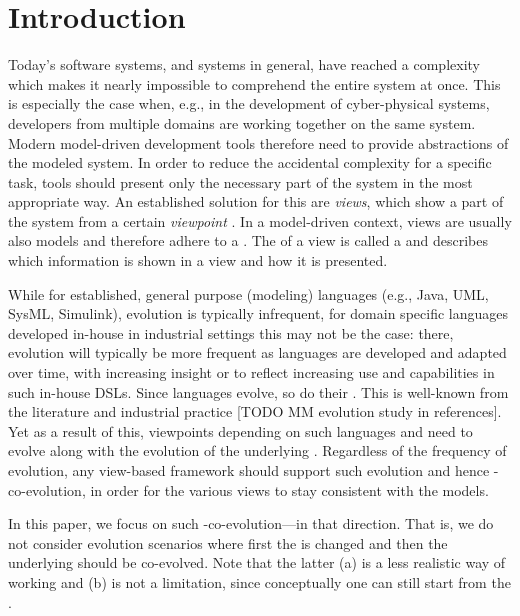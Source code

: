 \section{Introduction}
\label{sec:Introduction}

Today's software systems, and systems in general, have reached a complexity which makes it nearly impossible to comprehend the entire system at once.
This is especially the case when, e.g., in the development of cyber-physical systems, developers from multiple domains are working together on the same system.
Modern model-driven development tools therefore need to provide abstractions of the modeled system.
In order to reduce the accidental complexity for a specific task, tools should present only the necessary part of the system in the most appropriate way.
An established solution for this are \emph{views}, which show a part of the system from a certain \emph{viewpoint} \autocite{atkinson_orthographic_2010}.
In a model-driven context, views are usually also models and therefore adhere to a \metamodel.
The \metamodel of a view is called a \viewtype \autocite{goldschmidt_towards_2012} and describes which information is shown in a view and how it is presented.

While for established, general purpose (modeling) languages (e.g., Java, UML, SysML, Simulink), evolution is typically infrequent, for domain specific languages developed in-house in industrial settings this may not be the case: there, evolution will typically be more frequent as languages are developed and adapted over time, with increasing insight or to reflect increasing use and capabilities in such in-house DSLs. Since languages evolve, so do their \metamodels. This is well-known from the literature and industrial practice [TODO MM evolution study in references]. Yet as a result of this, viewpoints  depending on such languages and \metamodels need to evolve along with the evolution of the underlying \metamodels. Regardless of the frequency of \metamodel evolution, any view-based framework should support such evolution and hence  \metamodel-\viewtype co-evolution, in order for the various views to stay consistent with the models. 

In this paper, we focus on such \metamodel-\viewtype co-evolution---in that direction. That is, we do not consider evolution scenarios where first the \viewtype is changed and then the underlying \metamodel should be co-evolved. Note that the latter (a) is a less realistic way of working  and (b) is not a limitation, since conceptually one can still start from the \viewtype.

